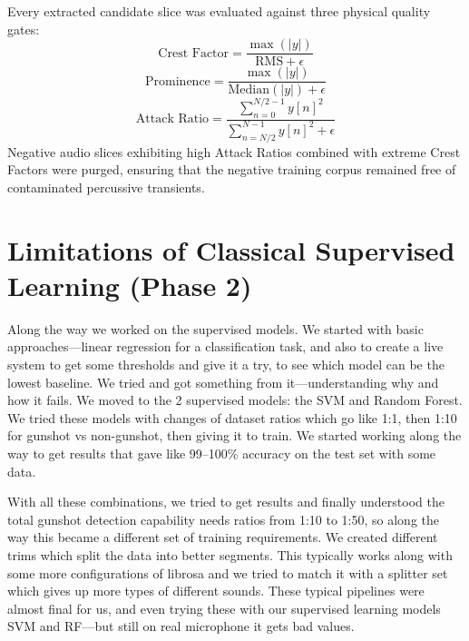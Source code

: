 \documentclass[conference]{IEEEtran}
\begin{document}
Every extracted candidate slice was evaluated against three physical quality gates:
\begin{equation}
    \text{Crest Factor} = \frac{\max(|y|)}{\text{RMS} + \epsilon}
    \label{eq:crest_factor}
\end{equation}
\begin{equation}
    \text{Prominence} = \frac{\max(|y|)}{\text{Median}(|y|) + \epsilon}
    \label{eq:prominence}
\end{equation}
\begin{equation}
    \text{Attack Ratio} = \frac{\sum_{n=0}^{N/2-1} y[n]^2}{\sum_{n=N/2}^{N-1} y[n]^2 + \epsilon}
    \label{eq:attack_ratio}
\end{equation}
Negative audio slices exhibiting high Attack Ratios combined with extreme Crest Factors were purged, ensuring that the negative training corpus remained free of contaminated percussive transients.

\section{Limitations of Classical Supervised Learning (Phase 2)}
\label{sec:classical_ml}

Along the way we worked on the supervised models. We started with basic approaches---linear regression for a classification task, and also to create a live system to get some thresholds and give it a try, to see which model can be the lowest baseline. We tried and got something from it---understanding why and how it fails. We moved to the 2 supervised models: the SVM and Random Forest. We tried these models with changes of dataset ratios which go like 1:1, then 1:10 for gunshot vs non-gunshot, then giving it to train. We started working along the way to get results that gave like 99--100\% accuracy on the test set with some data.

With all these combinations, we tried to get results and finally understood the total gunshot detection capability needs ratios from 1:10 to 1:50, so along the way this became a different set of training requirements. We created different trims which split the data into better segments. This typically works along with some more configurations of librosa and we tried to match it with a splitter set which gives up more types of different sounds. These typical pipelines were almost final for us, and even trying these with our supervised learning models SVM and RF---but still on real microphone it gets bad values.
\end{document}
